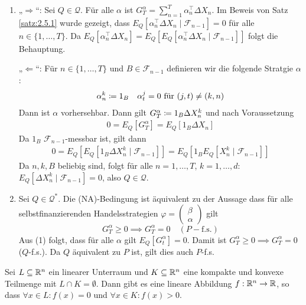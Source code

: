 \documentclass[a4paper,twoside,DIV15,BCOR12mm]{scrbook}
\newcommand{\cF}{\mathcal F}
\newcommand{\cQ}{\mathcal Q}
\begin{document}
\begin{beweis}
\begin{enumerate}
\item „$\Longrightarrow$“: Sei $Q\in\cQ$. Für alle $\alpha$ ist $G_T^\alpha = \sum_{n=1}^T \alpha_n^\top \Delta X_n$. Im Beweis von Satz \ref{satz:2.5.1} wurde gezeigt, dass $E_Q[\alpha_n^\top \Delta X_n\mid \cF_{n-1}]=0$ für alle $n\in\{1,\ldots,T\}$. Da $E_Q[\alpha_n^\top \Delta X_n] = E_Q[E_Q[\alpha_n^\top \Delta X_n \mid \cF_{n-1}]]$ folgt die Behauptung.

„$\Longleftarrow$“: Für $n\in\{1,\ldots,T\}$ und $B\in\cF_{n-1}$ definieren wir die folgende Stratgie $\alpha$:
\begin{align*}
\alpha_n^k\da 1_B && \alpha_t^j = 0 \text{ für } (j,t) \ne (k,n)
\end{align*}
Dann ist $\alpha$ vorhersehbar. Dann gilt $G_T^\alpha \da 1_B\Delta X_n^k$ und nach Voraussetzung
\begin{align*}
0 = E_Q[G_T^\alpha] = E_Q[1_B \Delta X_n]
\end{align*}
Da $1_B$ $\cF_{n-1}$-messbar ist, gilt dann 
\begin{align*}
0 = E_Q[E_Q[1_B \Delta X_n^k\mid \cF_{n-1}]] = E_Q[1_B E_Q[X_n^k\mid \cF_{n-1}]]
\end{align*}
Da $n,k,B$ beliebig sind, folgt für alle $n=1,\ldots,T$, $k=1,\ldots,d$: $E_Q[\Delta X_n^k\mid \cF_{n-1}]=0$, also $Q\in \cQ$.
\item Sei $Q\in \cQ^*$. Die (NA)-Bedingung ist äquivalent zu der Aussage dass für alle selbstfinanzierenden Handelsstrategien
$\varphi=\left(\begin{smallmatrix} \beta \\ \alpha \end{smallmatrix}\right)$ 
gilt
\[
G_T^\alpha \ge 0 \implies G_T^\alpha = 0 \quad (P-\text{f.s.})
\]
Aus (1) folgt, dass für alle $\alpha$ gilt $E_Q[G^\alpha_t] = 0$. Damit ist $G_T^\alpha \ge 0 \implies G_T^\alpha = 0$ ($Q$-f.s.). Da $Q$ äquivalent zu $P$ ist, gilt dies auch $P$-f.s.
\end{enumerate}
\end{beweis}


\begin{lemma}[Trennungssatz]
Sei $L\subseteq \mathbb{R}^n$ ein linearer Unterraum und $K\subseteq \mathbb{R}^n$ eine kompakte und konvexe Teilmenge mit $L\cap K=\emptyset$. Dann gibt es eine lineare Abbildung $f:\mathbb{R}^n \to \mathbb{R}$, so dass $\forall x\in L: f(x) = 0$ und $\forall x\in K: f(x) >0$.
\label{lem:2.5.3}
\end{lemma}
\end{document}
